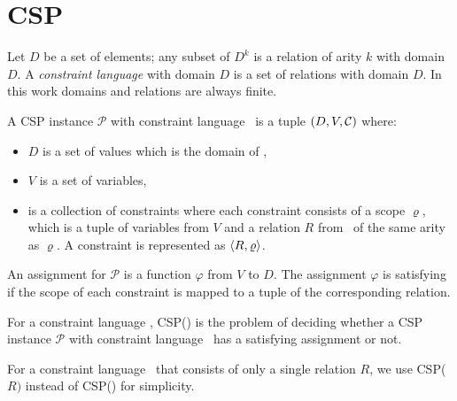 \section{CSP} 
Let \(D\) be a set of elements; any subset of \(D^k\) is a relation of arity \(k\) with
domain \(D\)\@. A \emph{constraint language} with domain \(D\) is a set of
relations with domain \(D\)\@.
In this work domains and relations are always finite.

A CSP instance \(\mathcal{P}\) with constraint language \mrelset\ is a tuple 
\((D,V,\mathcal{C})\) where:
\begin{itemize}
\item \(D\) is a set of values which is the domain of \mrelset,
\item \(V\) is a set of variables,
\item \mconset is a collection of constraints where each constraint consists of a scope \(\varrho\),
which is a tuple of variables from \(V\) and a relation \(R\) from \mrelset\
of the same arity as \(\varrho\)\@. A constraint is represented as \(\langle R, \varrho \rangle\)\@.
\end{itemize}

An assignment for \(\mathcal{P}\) is a function \(\varphi\) from \(V\) to \(D\)\@. The assignment
\(\varphi\) is satisfying if the scope of each constraint is
mapped to a tuple of the corresponding relation.

\begin{defi}
For a constraint language \mrelset, CSP(\mrelset) is the problem of deciding 
whether a CSP instance \(\mathcal{P}\) with constraint language \mrelset\
has a satisfying assignment or not.
\end{defi}

For a constraint language \mrelset\ that consists of only a single relation \(R\),
we use CSP(\(R)\) instead of CSP(\mrelset) for simplicity.

